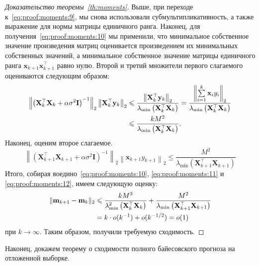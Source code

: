 \begin{proof}[Доказательство теоремы~\ref{th:moments}]
    Выше, при переходе к~\eqref{eq:proof:moments:9}, мы снова использовали субмультипликативность, а также выражение для нормы матрицы единичного ранга. Наконец, для получения~\eqref{eq:proof:moments:10} мы применили, что минимальное собственное значение произведения матриц оценивается произведением их минимальных собственных значений, а минимальное собственное значение матрицы единичного ранга $\mathbf{x}_{k+1} \mathbf{x}_{k+1}^\top$ равно нулю. Второй и третий множители первого слагаемого оцениваются следующим образом:
    \begin{align}
        \left\| \left( \mathbf{X}_k^\top \mathbf{X}_k + \alpha \sigma^2 \mathbf{I} \right)^{-1} \right\|_2 \left\| \mathbf{X}_k^\top \mathbf{y}_k \right\|_2
        &\leqslant \frac{\left\| \mathbf{X}_k^\top \mathbf{y}_k \right\|_2}{\lambda_{\min}\left( \mathbf{X}_k^\top \mathbf{X}_k \right)} = \frac{\left\| \sum\limits_{i=1}^{k} \mathbf{x}_i y_i \right\|_2}{\lambda_{\min}\left( \mathbf{X}_k^\top \mathbf{X}_k \right)} \notag \\
        &\leqslant \frac{k M^2}{\lambda_{\min}\left( \mathbf{X}_k^\top \mathbf{X}_k \right)}. \label{eq:proof:moments:11}
    \end{align}
    Наконец, оценим второе слагаемое.
    \begin{equation}
        \left\| \left( \mathbf{X}_{k+1}^\top \mathbf{X}_{k+1} + \alpha \sigma^2 \mathbf{I} \right)^{-1} \right\|_2 \left\| \mathbf{x}_{k+1} y_{k+1} \right\|_2 \leqslant \frac{M^2}{\lambda_{\min}\left( \mathbf{X}_{k+1}^\top \mathbf{X}_{k+1} \right)} \label{eq:proof:moments:12}
    \end{equation}
    Итого, собирая воедино~\eqref{eq:proof:moments:10}, \eqref{eq:proof:moments:11} и \eqref{eq:proof:moments:12}, имеем следующую оценку:
    \begin{align}
        \| \mathbf{m}_{k+1} - \mathbf{m}_k \|_2
        &\leqslant \frac{k M^3}{\lambda_{\min}^2\left( \mathbf{X}_k^\top \mathbf{X}_k \right)} + \frac{M^2}{\lambda_{\min}\left( \mathbf{X}_{k+1}^\top \mathbf{X}_{k+1} \right)} \notag \\
        &= k \cdot o(k^{-1}) + o(k^{-1/2}) = o(1)
    \end{align}
    при $k \to \infty$. Таким образом, получили требуемую сходимость.
\end{proof}

Наконец, докажем теорему о сходимости полного байесовского прогноза на отложенной выборке.

